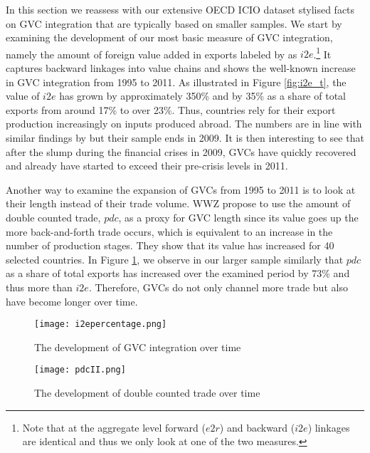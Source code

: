 \documentclass[11pt,a4paper]{article}
\begin{document}
In this section we reassess with our extensive OECD ICIO dataset stylised facts on GVC integration that are typically based on smaller samples. We start by examining the development of our most basic measure of GVC integration, namely the amount of foreign value added in exports labeled by \citet{ribajalo13} as $i2e$.\footnote{Note that at the aggregate level forward ($e2r$) and backward ($i2e$) linkages are identical and thus we only look at one of the two measures.} It captures backward linkages into value chains and shows the well-known increase in GVC integration from 1995 to 2011. As illustrated in Figure \ref{fig:i2e_t}, the value of $i2e$ has grown by approximately 350\% and by 35\% as a share of total exports from around 17\% to over 23\%. Thus, countries rely for their export production increasingly on inputs produced abroad. The numbers are in line with similar findings by \citet{rojoguno12b} but their sample ends in 2009. It is then interesting to see that after the slump during the financial crises in 2009, GVCs have quickly recovered and already have started to exceed their pre-crisis levels in 2011.

Another way to examine the expansion of GVCs from 1995 to 2011 is to look at their length instead of their trade volume. WWZ propose to use the amount of double counted trade, $pdc$, as a proxy for GVC length since its value goes up the more back-and-forth trade occurs, which is equivalent to an increase in the number of production stages. They show that its value has increased for 40 selected countries. In Figure \ref{fig:pdc_t}, we observe in our larger sample similarly that $pdc$ as a share of total exports has increased over the examined period by 73\% and thus more than $i2e$. Therefore, GVCs do not only channel more trade but also have become longer over time.

\begin{figure}
\centering
\begin{minipage}{0.45\textwidth}
\vspace{0.8cm}
\centering
\texttt{[image: i2epercentage.png]}
\caption{The development of GVC integration over time}
\label{fig:i2e_t}
\end{minipage}\hfill
\begin{minipage}{0.45\textwidth}
\centering
\texttt{[image: pdcII.png]}
\caption{The development of double counted trade over time}
\label{fig:pdc_t}
\end{minipage}
\end{figure}
\end{document}
